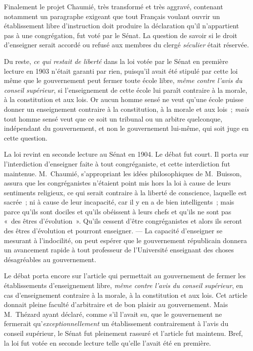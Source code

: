 \documentclass[french,twoside]{book} %
\begin{document}
Finalement le projet Chaumié, très transformé et très aggravé, contenant notamment un paragraphe exigeant que tout Français voulant ouvrir un établissement libre d’instruction doit produire la déclaration qu’il n’appartient pas à une congrégation, fut voté par le Sénat. La question de savoir si le droit d’enseigner serait accordé ou refusé aux membres du clergé {\itshape séculier} était réservée.\par
Du reste, {\itshape ce qui restait de liberté} dans la loi votée par le Sénat en première lecture en 1903 n’était garanti par rien, puisqu’il avait été stipulé par cette loi même que le gouvernement peut fermer toute école libre, {\itshape même contre l’avis du conseil supérieur}, si l’enseignement de cette école lui paraît contraire à la morale, à la constitution et aux lois. Or aucun homme sensé ne veut qu’une école puisse donner un enseignement contraire à la constitution, à la morale et aux lois ; {\itshape mais} tout homme sensé veut que ce soit un tribunal ou un arbitre quelconque, indépendant du gouvernement, et non le gouvernement lui-même, qui soit juge en cette question.\par
La loi revint en seconde lecture au Sénat en 1904. Le débat fut court. Il porta sur l’interdiction d’enseigner  faite à tout congréganiste, et cette interdiction fut maintenue. M. Chaumié, s’appropriant les idées philosophiques de M. Buisson, assura que les congréganistes n’étaient point mis hors la loi à cause de leurs sentiments religieux, ce qui serait contraire à la liberté de conscience, laquelle est sacrée ; ni à cause de leur incapacité, car il y en a de bien intelligents ; mais parce qu’ils sont dociles et qu’ils obéissent à leurs chefs et qu’ils ne sont pas « des êtres d’évolution ». Qu’ils cessent d’être congréganistes et alors ils seront des êtres d’évolution et pourront enseigner. — La capacité d’enseigner se mesurant à l’indocilité, on peut espérer que le gouvernement républicain donnera un avancement rapide à tout professeur de l’Université enseignant des choses désagréables au gouvernement.\par
Le débat porta encore sur l’article qui permettait au gouvernement de fermer les établissements d’enseignement libre, {\itshape même contre l’avis du conseil supérieur}, en cas d’enseignement contraire à la morale, à la constitution et aux lois. Cet article donnait pleine faculté d’arbitraire et de bon plaisir au gouvernement. Mais M. Thézard ayant déclaré, comme s’il l’avait su, que le gouvernement ne fermerait qu’{\itshape exceptionnellement} un établissement contrairement à l’avis du conseil supérieur, le Sénat fut pleinement rassuré et l’article fut maintenu.  Bref, la loi fut votée en seconde lecture telle qu’elle l’avait été en première.\par
\end{document}
